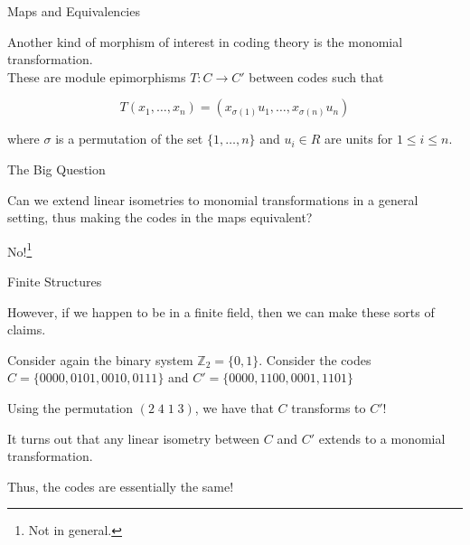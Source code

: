 \documentclass{beamer}
\begin{document}
\begin{frame}{Maps and Equivalencies}
    
    Another kind of morphism of interest in coding theory is the monomial transformation.\\
    These are module epimorphisms $T:C\to C'$ between codes such that

    $$T(x_1,\ldots,x_n)=(x_{\sigma(1)}u_1,\ldots,x_{\sigma(n)}u_n)$$
    
    where $\sigma$ is a permutation of the set $\{1,\ldots,n\}$ and $u_i\in R$ are units for
    $1\leq i\leq n$.

\end{frame}

\begin{frame}{The Big Question}
    
    Can we extend linear isometries to monomial transformations in a general setting, thus making the
    codes in the maps equivalent?

\end{frame}

\begin{frame}
    
    \begin{center}
        No!\footnote{Not in general.}
    \end{center}

\end{frame}

\begin{frame}{Finite Structures}
    
    However, if we happen to be in a finite field, then we can make these sorts of claims.

    \medskip

    Consider again the binary system $\mathbb{Z}_2=\{0,1\}$. Consider the codes
    $C=\{0000,0101,0010,0111\}$ and $C'=\{0000,1100,0001,1101\}$

    \medskip

    Using the permutation $(2\;4\;1\;3)$, we have that $C$ transforms to $C'$!
    
    \bigskip

    \pause

    It turns out that any linear isometry between $C$ and $C'$ extends to a monomial transformation.\\

    \pause

    Thus, the codes are essentially the same!

\end{frame}
\end{document}
